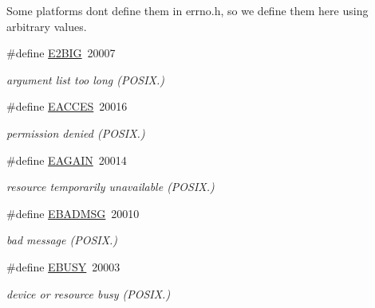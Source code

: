Some platforms don\textquotesingle{}t define them in errno.\+h, so we define them here using arbitrary values. \begin{DoxyCompactItemize}
\item 
\mbox{\label{group__hal_gaba8481985c201ff726f349d7f2d09895}} 
\#define \hyperlink{group__hal_gaba8481985c201ff726f349d7f2d09895}{E2\+B\+IG}~20007
\begin{DoxyCompactList}\small\item\em argument list too long (P\+O\+S\+I\+X.) \end{DoxyCompactList}\item 
\mbox{\label{group__hal_gac2a2e9fa555401f94478f74e01868032}} 
\#define \hyperlink{group__hal_gac2a2e9fa555401f94478f74e01868032}{E\+A\+C\+C\+ES}~20016
\begin{DoxyCompactList}\small\item\em permission denied (P\+O\+S\+I\+X.) \end{DoxyCompactList}\item 
\mbox{\label{group__hal_gaf0fac1cea1165b4debec7f686edf3313}} 
\#define \hyperlink{group__hal_gaf0fac1cea1165b4debec7f686edf3313}{E\+A\+G\+A\+IN}~20014
\begin{DoxyCompactList}\small\item\em resource temporarily unavailable (P\+O\+S\+I\+X.) \end{DoxyCompactList}\item 
\mbox{\label{group__hal_ga251e9b536ed96ccb16aa28ca2d5bd656}} 
\#define \hyperlink{group__hal_ga251e9b536ed96ccb16aa28ca2d5bd656}{E\+B\+A\+D\+M\+SG}~20010
\begin{DoxyCompactList}\small\item\em bad message (P\+O\+S\+I\+X.) \end{DoxyCompactList}\item 
\mbox{\label{group__hal_ga8368025077a0385849d6817b2007c095}} 
\#define \hyperlink{group__hal_ga8368025077a0385849d6817b2007c095}{E\+B\+U\+SY}~20003
\begin{DoxyCompactList}\small\item\em device or resource busy (P\+O\+S\+I\+X.) \end{DoxyCompactList}\item 

\end{DoxyCompactItemize}
